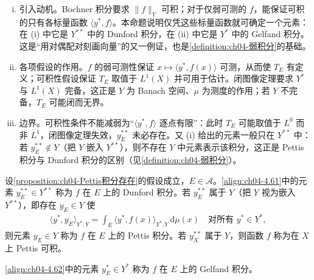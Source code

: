 \documentclass[../../main.tex]{subfiles}%
\begin{document}
\begin{remark}\label{remark:ch04-Pettis积分存在动机}
\begin{enumerate}[(i)]
\item 引入动机。Bochner 积分要求 $\|f\|_Y$ 可积；对于仅弱可测的 $f$，能保证可积的只有各标量函数 $\langle y^*,f\rangle$。本命题说明仅凭这些标量函数就可确定一个元素：在 (i) 中它是 $Y^{**}$ 中的 Dunford 积分，在 (ii) 中它是 $Y^*$ 中的 Gelfand 积分。这是“用对偶配对刻画向量”的又一例证，也是\cref{definition:ch04-弱积分}的基础。

\item 各项假设的作用。$f$ 的弱可测性保证 $x\mapsto\langle y^*,f(x)\rangle$ 可测，从而使 $T_E$ 有定义；可积性假设保证 $T_E$ 取值于 $L^1(X)$ 并可用于估计。闭图像定理要求 $Y^*$ 与 $L^1(X)$ 完备，这正是 $Y$ 为 Banach 空间、$\mu$ 为测度的作用；若 $Y$ 不完备，$T_E$ 可能闭而无界。

\item 边界。可积性条件不能减弱为“$\langle y^*,f\rangle$ 逐点有限”：此时 $T_E$ 可能取值于 $L^0$ 而非 $L^1$，闭图像定理失效，$y_E^{**}$ 未必存在。又 (i) 给出的元素一般只在 $Y^{**}$ 中：若 $y_E^{**}\notin Y$（把 $Y$ 嵌入 $Y^{**}$），则不存在 $Y$ 中元素表示该积分，这正是 Pettis 积分与 Dunford 积分的区别（见\cref{definition:ch04-弱积分}）。
\end{enumerate}
\end{remark}

\begin{definition}\label{definition:ch04-弱积分}
设\cref{proposition:ch04-Pettis积分存在}的假设成立，$E\in\mathcal{A}$。\eqref{align:ch04-4.61}中的元素 $y_E^{**}\in Y^{**}$ 称为 $f$ 在 $E$ 上的 Dunford 积分。若 $y_E^{**}$ 属于 $Y$（把 $Y$ 视为嵌入 $Y^{**}$），即存在 $y_E\in Y$ 使
\begin{align}
\langle y^*,y_E\rangle_{Y^*,Y}=\int_E\langle y^*,f(x)\rangle_{Y^*,Y}\,\mathrm{d}\mu(x)\quad\text{对所有 }y^*\in Y^*, \label{align:ch04-4.63}
\end{align}
则元素 $y_E\in Y$ 称为 $f$ 在 $E$ 上的 Pettis 积分。若 $y_X^{**}$ 属于 $Y$，则函数 $f$ 称为在 $X$ 上 Pettis 可积。

\eqref{align:ch04-4.62}中的元素 $y_E^*\in Y^*$ 称为 $f$ 在 $E$ 上的 Gelfand 积分。
\end{definition}
\end{document}
